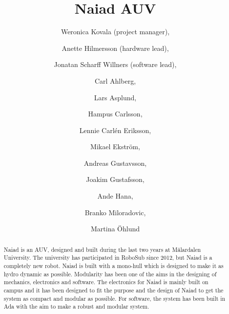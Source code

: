 \documentclass[twoside,12pt]{article}
\title{\vspace{-15mm}\fontsize{24pt}{10pt}\selectfont\textbf{Naiad AUV}} %
\author{
\large
Weronica Kovala (project manager), \and Anette Hilmersson (hardware lead), \and Jonatan Scharff Willners (software lead), \and Carl Ahlberg, \and Lars Asplund, \and Hampus Carlsson, \and Lennie Carl\'{e}n Eriksson, \and Mikael Ekstr\"{o}m, \and Andreas Gustavsson, \and Joakim Gustafsson, \and Ande Hana, \and Branko Miloradovic, \and Martina \"{O}hlund\\[2mm] %
\vspace{-5mm}
}
\date{}
\begin{document}
\maketitle
\thispagestyle{fancy}
\begin{abstract}
Naiad is an AUV, designed and built during the last two years at M\"{a}lardalen University. The university has participated in RoboSub since 2012, but Naiad is a completely new robot. Naiad is built with a mono-hull which is designed to make it as hydro dynamic as possible. Modularity has been one of the aims in the designing of mechanics, electronics and software. The electronics for Naiad is mainly built on campus and it has been designed to fit the purpose and the design of Naiad to get the system as compact and modular as possible. For software, the system has been built in Ada with the aim to make a robust and modular system. 
\end{abstract}
\end{document}
